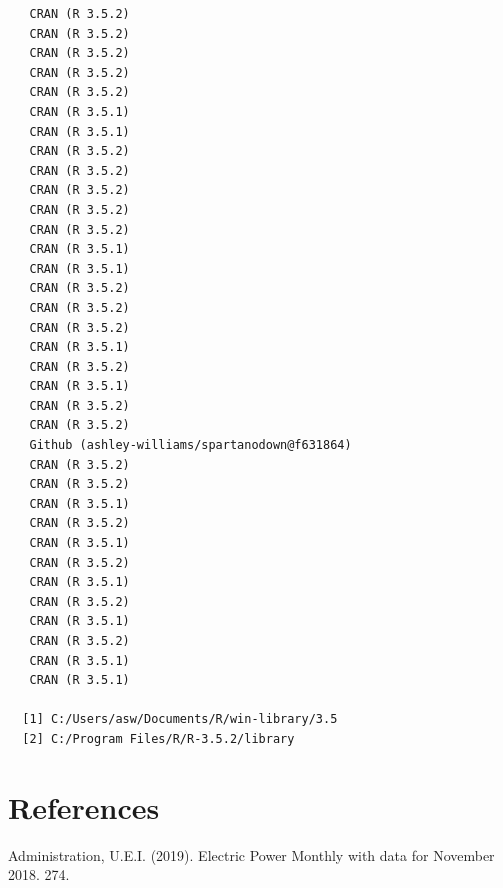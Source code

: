 \documentclass[ms]{uncgdissertationexp}
\theoremstyle{plain}
\theoremstyle{definition}
\theoremstyle{remark}
\begin{document}
\begin{verbatim}
   CRAN (R 3.5.2)                               
   CRAN (R 3.5.2)                               
   CRAN (R 3.5.2)                               
   CRAN (R 3.5.2)                               
   CRAN (R 3.5.2)                               
   CRAN (R 3.5.1)                               
   CRAN (R 3.5.1)                               
   CRAN (R 3.5.2)                               
   CRAN (R 3.5.2)                               
   CRAN (R 3.5.2)                               
   CRAN (R 3.5.2)                               
   CRAN (R 3.5.2)                               
   CRAN (R 3.5.1)                               
   CRAN (R 3.5.1)                               
   CRAN (R 3.5.2)                               
   CRAN (R 3.5.2)                               
   CRAN (R 3.5.2)                               
   CRAN (R 3.5.1)                               
   CRAN (R 3.5.2)                               
   CRAN (R 3.5.1)                               
   CRAN (R 3.5.2)                               
   CRAN (R 3.5.2)                               
   Github (ashley-williams/spartanodown@f631864)
   CRAN (R 3.5.2)                               
   CRAN (R 3.5.2)                               
   CRAN (R 3.5.1)                               
   CRAN (R 3.5.2)                               
   CRAN (R 3.5.1)                               
   CRAN (R 3.5.2)                               
   CRAN (R 3.5.1)                               
   CRAN (R 3.5.2)                               
   CRAN (R 3.5.1)                               
   CRAN (R 3.5.2)                               
   CRAN (R 3.5.1)                               
   CRAN (R 3.5.1)                               
  
  [1] C:/Users/asw/Documents/R/win-library/3.5
  [2] C:/Program Files/R/R-3.5.2/library
  \end{verbatim}
  \backmatter
  
  \chapter*{References}\label{references}
  
  \noindent
  
  \setlength{\parindent}{-0.20in} \setlength{\leftskip}{0.20in}
  \setlength{\parskip}{8pt}
  
  \hypertarget{refs}{}
  \hypertarget{ref-usenergyinformationadministrationElectricPowerMonthly2019}{}
  Administration, U.E.I. (2019). Electric Power Monthly with data for
  November 2018. 274.
  
\end{document}
